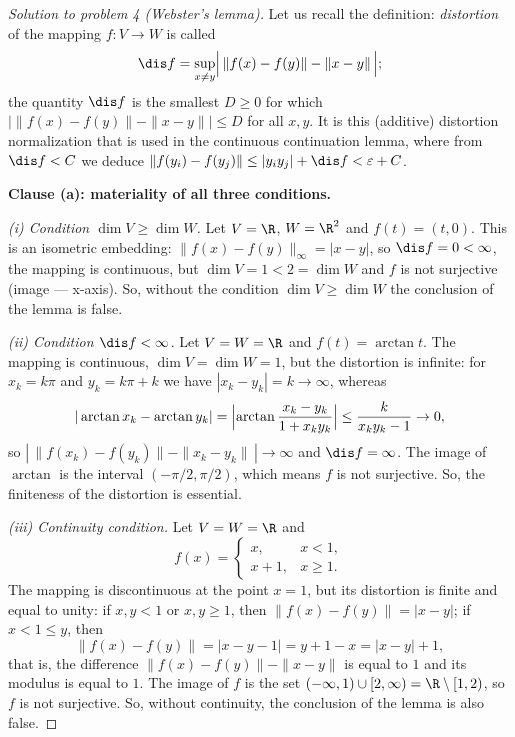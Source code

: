 \documentclass[a4paper,12pt]{report}
\begin{document}
\begin{proof}[Solution to problem \textup{4} \textup{(}Webster's lemma\textup{)}]

Let us recall the definition: \emph{distortion} of the mapping $f\colon V \to W$ is called
\[
\dis f = \sup_{x \ne y} \Bigl|\, \|f(x) - f(y)\| - \|x - y\| \,\Bigr|;
\]
the quantity $\dis f$ is the smallest $D \ge 0$ for which $\bigl|\|f(x)-f(y)\| - \|x-y\|\bigr| \le D$ for all $x, y$. It is this (additive) distortion normalization that is used in the continuous continuation lemma, where from $\dis f < C$ we deduce $\|f(y_i) - f(y_j)\| \le |y_i y_j| + \dis f < \varepsilon + C$.

\textbf{Clause \textup{(a)}: materiality of all three conditions.}

\textit{\textup{(i)} Condition $\dim V \ge \dim W$.} Let $V = \R$, $W = \R^2$ and $f(t) = (t,0)$. This is an isometric embedding: $\|f(x) - f(y)\|_\infty = |x - y|$, so $\dis f = 0 < \infty$, the mapping is continuous, but $\dim V = 1 < 2 = \dim W$ and $f$ is not surjective \textup{(}image --- x-axis\textup{)}. So, without the condition $\dim V \ge \dim W$ the conclusion of the lemma is false.

\textit{\textup{(ii)} Condition $\dis f < \infty$.} Let $V = W = \R$ and $f(t) = \arctan t$. The mapping is continuous, $\dim V = \dim W = 1$, but the distortion is infinite: for $x_k = k\pi$ and $y_k = k\pi + k$ we have $|x_k - y_k| = k \to \infty$, whereas
\[
|\arctan x_k - \arctan y_k| = \Bigl|\arctan\frac{x_k - y_k}{1 + x_k y_k}\Bigr| \le \frac{k}{x_k y_k - 1} \to 0,
\]
so $|\,\|f(x_k) - f(y_k)\| - \|x_k - y_k\|\,| \to \infty$ and $\dis f = \infty$. The image of $\arctan$ is the interval $(-\pi/2, \pi/2)$, which means $f$ is not surjective. So, the finiteness of the distortion is essential.

\textit{\textup{(iii)} Continuity condition.} Let $V = W = \R$ and
\[
f(x) = \begin{cases} x, & x < 1, \\ x + 1, & x \ge 1. \end{cases}
\]
The mapping is discontinuous at the point $x = 1$, but its distortion is finite and equal to unity: if $x, y < 1$ or $x, y \ge 1$, then $\|f(x) - f(y)\| = |x - y|$; if $x < 1 \le y$, then
\[
\|f(x) - f(y)\| = |x - y - 1| = y + 1 - x = |x - y| + 1,
\]
that is, the difference $\|f(x)-f(y)\| - \|x-y\|$ is equal to $1$ and its modulus is equal to $1$. The image of $f$ is the set $(-\infty, 1) \cup [2, \infty) = \R \setminus [1,2)$, so $f$ is not surjective. So, without continuity, the conclusion of the lemma is also false.


\end{proof}
\end{document}

